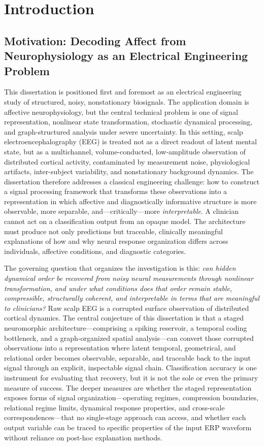 \chapter{Introduction}
\label{chap:introduction}

\section{Motivation: Decoding Affect from Neurophysiology as an Electrical Engineering Problem}

This dissertation is positioned first and foremost as an electrical engineering study of structured, noisy, nonstationary biosignals. The application domain is affective neurophysiology, but the central technical problem is one of signal representation, nonlinear state transformation, stochastic dynamical processing, and graph-structured analysis under severe uncertainty. In this setting, scalp electroencephalography (EEG) is treated not as a direct readout of latent mental state, but as a multichannel, volume-conducted, low-amplitude observation of distributed cortical activity, contaminated by measurement noise, physiological artifacts, inter-subject variability, and nonstationary background dynamics. The dissertation therefore addresses a classical engineering challenge: how to construct a signal processing framework that transforms these observations into a representation in which affective and diagnostically informative structure is more observable, more separable, and---critically---more \emph{interpretable}. A clinician cannot act on a classification output from an opaque model. The architecture must produce not only predictions but traceable, clinically meaningful explanations of how and why neural response organization differs across individuals, affective conditions, and diagnostic categories.

The governing question that organizes the investigation is this: \emph{can hidden dynamical order be recovered from noisy neural measurements through nonlinear transformation, and under what conditions does that order remain stable, compressible, structurally coherent, and interpretable in terms that are meaningful to clinicians?} Raw scalp EEG is a corrupted surface observation of distributed cortical dynamics. The central conjecture of this dissertation is that a staged neuromorphic architecture---comprising a spiking reservoir, a temporal coding bottleneck, and a graph-organized spatial analysis---can convert those corrupted observations into a representation where latent temporal, geometrical, and relational order becomes observable, separable, and traceable back to the input signal through an explicit, inspectable signal chain. Classification accuracy is one instrument for evaluating that recovery, but it is not the sole or even the primary measure of success. The deeper measures are whether the staged representation exposes forms of signal organization---operating regimes, compression boundaries, relational regime limits, dynamical response properties, and cross-scale correspondences---that no single-stage approach can access, and whether each output variable can be traced to specific properties of the input ERP waveform without reliance on post-hoc explanation methods.

